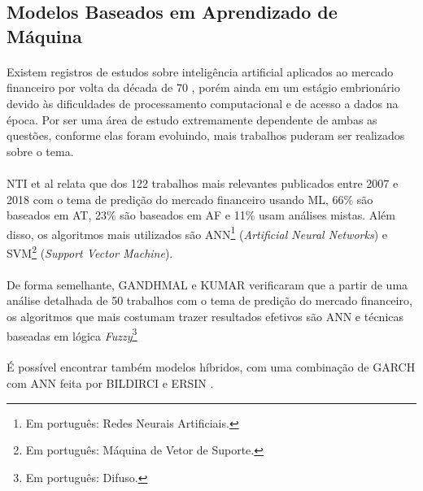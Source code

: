 \subsection{Modelos Baseados em Aprendizado de Máquina}

\paragraph{} Existem registros de estudos sobre inteligência artificial aplicados ao mercado financeiro por volta da década de 70 \cite{felsen1975artificial}, porém ainda em um estágio embrionário devido às dificuldades de processamento computacional e de acesso a dados na época. Por ser uma área de estudo extremamente dependente de ambas as questões, conforme elas foram evoluindo, mais trabalhos puderam ser realizados sobre o tema.

\paragraph{} NTI et al \cite{nti2020systematic} relata que dos 122 trabalhos mais relevantes publicados entre 2007 e 2018 com o tema de predição do mercado financeiro usando ML, 66\% são baseados em AT, 23\% são baseados em AF e 11\% usam análises mistas. Além disso, os algoritmos mais utilizados são ANN\footnote{Em português: Redes Neurais Artificiais.} (\textit{Artificial Neural Networks}) e SVM\footnote{Em português: Máquina de Vetor de Suporte.} (\textit{Support Vector Machine}).

\paragraph{} De forma semelhante, GANDHMAL e KUMAR \cite{gandhmal2019systematic} verificaram que a partir de uma análise detalhada de 50 trabalhos com o tema de predição do mercado financeiro, os algoritmos que mais costumam trazer resultados efetivos são ANN e técnicas baseadas em lógica \textit{Fuzzy}\footnote{Em português: Difuso.}

\paragraph{} É possível encontrar também modelos híbridos, com uma combinação de GARCH com ANN feita por BILDIRCI e ERSIN \cite{bildirici2009improving}.